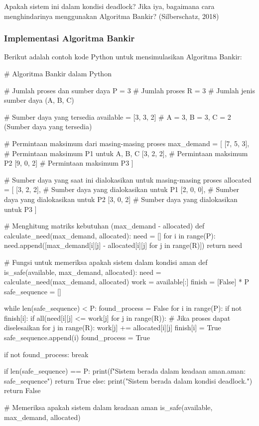 \documentclass[12pt]{article}
\begin{document}
Apakah sistem ini dalam kondisi deadlock? Jika iya, bagaimana cara menghindarinya menggunakan Algoritma Bankir? (Silberschatz, 2018) \cite{silberschatz2018operating}

\subsubsection{Implementasi Algoritma Bankir}
Berikut adalah contoh kode Python untuk mensimulasikan Algoritma Bankir:

\begin{python}

    # Algoritma Bankir dalam Python
    
    # Jumlah proses dan sumber daya
    P = 3  # Jumlah proses
    R = 3  # Jumlah jenis sumber daya (A, B, C)
    
    # Sumber daya yang tersedia
    available = [3, 3, 2]  # A = 3, B = 3, C = 2 (Sumber daya yang tersedia)
    
    # Permintaan maksimum dari masing-masing proses
    max_demand = [
        [7, 5, 3],  # Permintaan maksimum P1 untuk A, B, C
        [3, 2, 2],  # Permintaan maksimum P2
        [9, 0, 2]   # Permintaan maksimum P3
    ]
    
    # Sumber daya yang saat ini dialokasikan untuk masing-masing proses
    allocated = [
        [3, 2, 2],  # Sumber daya yang dialokasikan untuk P1
        [2, 0, 0],  # Sumber daya yang dialokasikan untuk P2
        [3, 0, 2]   # Sumber daya yang dialokasikan untuk P3
    ]
    
    # Menghitung matriks kebutuhan (max_demand - allocated)
    def calculate_need(max_demand, allocated):
        need = []
        for i in range(P):
            need.append([max_demand[i][j] - allocated[i][j] for j in range(R)])
        return need
    
    # Fungsi untuk memeriksa apakah sistem dalam kondisi aman
    def is_safe(available, max_demand, allocated):
        need = calculate_need(max_demand, allocated)
        work = available[:]
        finish = [False] * P
        safe_sequence = []
    
        while len(safe_sequence) < P:
            found_process = False
            for i in range(P):
                if not finish[i]:
                    if all(need[i][j] <= work[j] for j in range(R)):
                        # Jika proses dapat diselesaikan
                        for j in range(R):
                            work[j] += allocated[i][j]
                        finish[i] = True
                        safe_sequence.append(i)
                        found_process = True
    
            if not found_process:
                break
    
        if len(safe_sequence) == P:
            print(f"Sistem berada dalam keadaan aman.\nUrutan aman: {safe_sequence}")
            return True
        else:
            print("Sistem berada dalam kondisi deadlock.")
            return False
    
    # Memeriksa apakah sistem dalam keadaan aman
    is_safe(available, max_demand, allocated)
\end{python}
\end{document}
